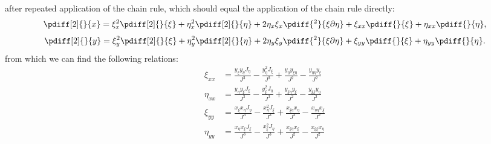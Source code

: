 %
after repeated application of the chain rule, which should equal the application of the chain rule directly:
%
\begin{align}\label{2orderpartialtransxfinal}
	\pdiff[2]{}{x}
	= \xi_x^2 \pdiff[2]{}{\xi}
	+ \eta_x^2 \pdiff[2]{}{\eta}
	+ 2\eta_x\xi_x \pdiff{^2}{\xi \partial \eta}
	+ \xi_{xx} \pdiff{}{\xi}
	+ \eta_{xx} \pdiff{}{\eta},
\end{align}
%
\begin{align}\label{2orderpartialtransyfinal}
	\pdiff[2]{}{y}
	= \xi_y^2 \pdiff[2]{}{\xi}
	+ \eta_y^2 \pdiff[2]{}{\eta}
	+ 2\eta_y\xi_y\pdiff{^2}{\xi \partial \eta}
	+ \xi_{yy} \pdiff{}{\xi}
	+ \eta_{yy}\pdiff{}{\eta}.
\end{align}
%
from which we can find the following relations:
%
\begin{align}
		\xi_{xx} &=
		\frac{y_{\xi} y_{\eta}J_{\eta}}{J^3}
		- \frac{y_{\eta}^2 J_{\xi}}{J^3}
		+ \frac{y_{\eta}y_{\xi\eta}}{J^2}
		-  \frac{y_{\eta \eta} y_{\xi}}{J^2} \\
		\eta_{xx} &=
		\frac{y_{\eta} y_{\xi} J_{\xi}}{J^3}
		- \frac{y_{\xi}^2 J_{\eta}}{J^3}
		+  \frac{y_{\xi \eta}y_{\xi}}{J^2}
		- \frac{ y_{\xi\xi} y_{\eta}}{J^2} \\
		\xi_{yy} &=
		\frac{x_{\xi}x_{\eta}J_{\eta}}{J^3}
		-\frac{x_{\eta}^2J_{\xi}}{J^3}
		+ \frac{x_{\xi\eta} x_{\eta}}{J^2}
		- \frac{x_{\eta\eta}x_{\xi}}{J^2} \\
		\eta_{yy} &=
		\frac{x_{\eta}x_{\xi}J_{\xi}}{J^3}
		- \frac{ x_{\xi}^2J_{\eta}}{J^3}
		+ \frac{x_{\xi\eta}x_{\xi}}{J^2}
		- \frac{x_{\xi \xi}x_{\eta}}{J^2}
\end{align}


